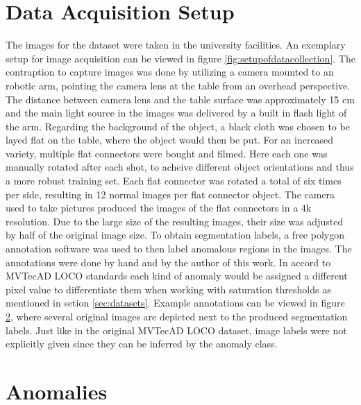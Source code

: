 



\section{Data Acquisition Setup}
\label{sec:faltconnectordataacquisiton}

The images for the dataset were taken in the university facilities. An exemplary setup for image acquisition can be viewed in figure \ref{fig:setupofdatacollection}. The contraption to capture images was 
done by utilizing a camera mounted to an robotic arm, pointing the camera lens at the table from an overhead perspective. The distance between camera lens and the table surface was approximately 15 cm and the main light source in the 
images was delivered by a built in flash light of the arm. Regarding the background of the object, a black cloth was chosen to be layed flat on the table, where the object would then be put. For 
an increased variety, multiple flat connectors were bought and filmed. Here each one was manually rotated after each shot, to acheive different object orientations and thus a more robust training 
set. Each flat connector was rotated a total of six times per side, resulting in 12 normal images per flat connector object. \newline
The camera used to take pictures produced the images of the flat connectors in a 4k resolution. Due to the large size of the resulting 
images, their size was adjusted by half of the original image size.\newline
To obtain segmentation labels, a free polygon annotation software was used to then label anomalous regions in the images. The annotations were done by hand and by the author of this work. In accord to 
MVTecAD LOCO standards \cite{LOCODentsAndScratchesBergmann2022} each kind of anomaly would be assigned a different pixel value to differentiate them when working with saturation thresholds 
as mentioned in setion \ref{sec:datasets}. Example annotations can be viewed in figure \ref{sec:flatconnectoranomalies}, where several original images are depicted next to the produced segmentation labels. Just like in the 
original MVTecAD LOCO dataset, image labels were not explicitly given since they can be inferred by the anomaly class.





\section{Anomalies}
\label{sec:flatconnectoranomalies}

